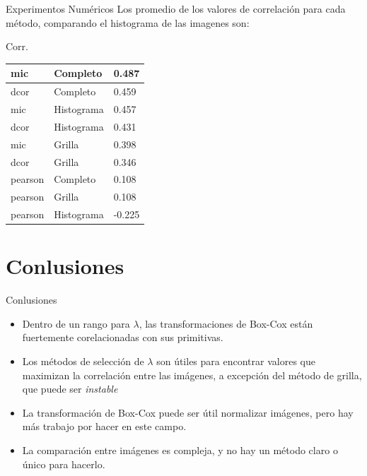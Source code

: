 \documentclass{beamer}
\begin{document}
\begin{frame}{Experimentos Numéricos}
    Los promedio de los valores de correlación para cada método, comparando el histograma de las imagenes son:
    \begin{block}{Corr.} 
        \begin{table}[H]
            \centering
            \begin{tabular}{|l|l|l|}\hline
            mic     & Completo    & 0.487  \\\hline
            dcor    & Completo    & 0.459  \\
            mic     & Histograma  & 0.457  \\
            dcor    & Histograma  & 0.431  \\
            mic     & Grilla      & 0.398  \\
            dcor    & Grilla      & 0.346 \\
            pearson & Completo    & 0.108  \\
            pearson & Grilla      & 0.108  \\
            pearson & Histograma  & -0.225 \\\hline
            \end{tabular}
        \end{table}
    \end{block}
\end{frame}

\section{Conlusiones}

\begin{frame}{Conlusiones}
    
    \begin{itemize}
        \item Dentro de un rango para $\lambda$, las transformaciones de Box-Cox están fuertemente corelacionadas con sus primitivas.
        \item Los métodos de selección de $\lambda$ son útiles para encontrar valores que maximizan la correlación entre las imágenes, a excepción del método de grilla, que puede ser \textit{instable}
        \item La transformación de Box-Cox puede ser útil normalizar imágenes, pero hay más trabajo por hacer en este campo.
        \item La comparación entre imágenes es compleja, y no hay un método claro o único para hacerlo.
    \end{itemize}
\end{frame}
\end{document}

